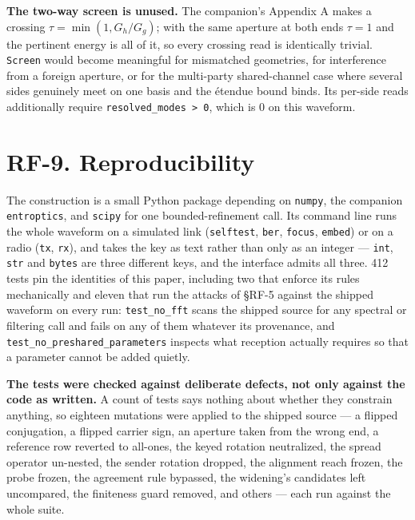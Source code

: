\documentclass[10pt,letterpaper,twocolumn]{article}
\begin{document}
\textbf{The two-way screen is unused.} The companion's Appendix A makes a crossing \(\tau = \min(1, G_h/G_g)\); with the same aperture at both ends \(\tau = 1\) and the pertinent energy is all of it, so every crossing read is identically trivial. \texttt{Screen} would become meaningful for mismatched geometries, for interference from a foreign aperture, or for the multi-party shared-channel case where several sides genuinely meet on one basis and the étendue bound binds. Its per-side reads additionally require \texttt{resolved\_\allowbreak{}modes\ \textgreater{}\allowbreak{}\ 0}, which is 0 on this waveform.

\section{RF-9. Reproducibility}\label{rf-9-reproducibility}

The construction is a small Python package depending on \texttt{numpy}, the companion \texttt{entroptics}, and \texttt{scipy} for one bounded-refinement call. Its command line runs the whole waveform on a simulated link (\texttt{selftest}, \texttt{ber}, \texttt{focus}, \texttt{embed}) or on a radio (\texttt{tx}, \texttt{rx}), and takes the key as text rather than only as an integer --- \texttt{int}, \texttt{str} and \texttt{bytes} are three different keys, and the interface admits all three. 412 tests pin the identities of this paper, including two that enforce its rules mechanically and eleven that run the attacks of §RF-5 against the shipped waveform on every run: \texttt{test\_\allowbreak{}no\_\allowbreak{}fft} scans the shipped source for any spectral or filtering call and fails on any of them whatever its provenance, and \texttt{test\_\allowbreak{}no\_\allowbreak{}preshared\_\allowbreak{}parameters} inspects what reception actually requires so that a parameter cannot be added quietly.

\textbf{The tests were checked against deliberate defects, not only against the code as written.} A count of tests says nothing about whether they constrain anything, so eighteen mutations were applied to the shipped source --- a flipped conjugation, a flipped carrier sign, an aperture taken from the wrong end, a reference row reverted to all-ones, the keyed rotation neutralized, the spread operator un-nested, the sender rotation dropped, the alignment reach frozen, the probe frozen, the agreement rule bypassed, the widening's candidates left uncompared, the finiteness guard removed, and others --- each run against the whole suite.
\end{document}
